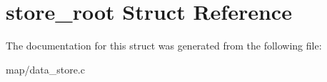 \hypertarget{structstore__root}{}\section{store\+\_\+root Struct Reference}
\label{structstore__root}


The documentation for this struct was generated from the following file\+:\begin{DoxyCompactItemize}
\item 
map/data\+\_\+store.\+c\end{DoxyCompactItemize}

